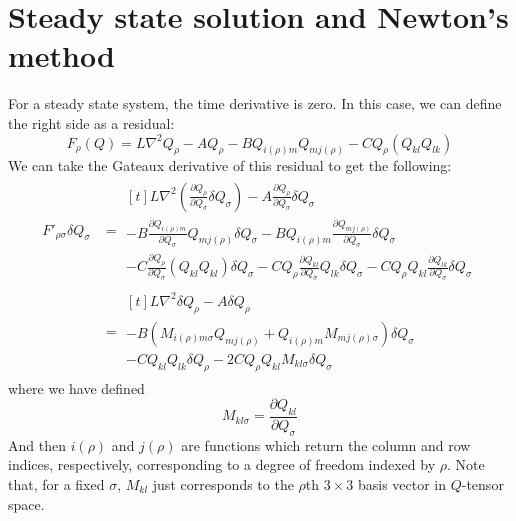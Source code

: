 \documentclass[reqno]{article}
\begin{document}
	\section{Steady state solution and Newton's method}
	For a steady state system, the time derivative is zero.
	In this case, we can define the right side as a residual:
	\begin{equation}
		F_\rho (Q)
		= L \nabla^2 Q_\rho
		- A Q_\rho
		- B Q_{i(\rho) m} Q_{m j(\rho)}
		- C Q_\rho (Q_{kl} Q_{lk})
	\end{equation}
	We can take the Gateaux derivative of this residual to get the following:
	\begin{equation}
	\begin{split}
		F'_{\rho \sigma} \delta Q_\sigma
		&= 
		\begin{multlined}[t]
		L \nabla^2 \left( \frac{\partial Q_\rho}{\partial Q_\sigma} \delta Q_\sigma \right)
		- A \frac{\partial Q_\rho}{\partial Q_\sigma} \delta Q_\sigma \\
		- B \frac{\partial Q_{i (\rho) m}}{\partial Q_\sigma} Q_{m j(\rho)} \delta Q_\sigma
		- B Q_{i(\rho) m} \frac{\partial Q_{m j(\rho)}}{\partial Q_\sigma} \delta Q_\sigma \\
		- C \frac{\partial Q_\rho}{\partial Q_\sigma} (Q_{kl} Q_{kl}) \delta Q_\sigma
		- C Q_\rho \frac{\partial Q_{kl}}{\partial Q_\sigma} Q_{lk} \delta Q_\sigma
		- C Q_\rho Q_{kl} \frac{\partial Q_{lk}}{\partial Q_\sigma} \delta Q_\sigma
		\end{multlined} \\
		&=
		\begin{multlined}[t]
		L \nabla^2 \delta Q_\rho
		- A \delta Q_\rho \\
		- B \left( M_{i(\rho) m \sigma} Q_{m j(\rho)} + Q_{i (\rho) m} M_{m j(\rho) \sigma} \right) \delta Q_\sigma \\
		- C Q_{kl} Q_{lk} \delta Q_\rho
		- 2 C Q_\rho Q_{kl} M_{kl\sigma} \delta Q_\sigma
		\end{multlined}
	\end{split}
	\end{equation}
	where we have defined
	\begin{equation}
		M_{kl\sigma}
		= \frac{\partial Q_{kl}}{\partial Q_\sigma}
	\end{equation}
	And then $i(\rho)$ and $j(\rho)$ are functions which return the column and row indices, respectively, corresponding to a degree of freedom indexed by $\rho$.
	Note that, for a fixed $\sigma$, $M_{kl}$ just corresponds to the $\rho$th $3\times 3$ basis vector in $Q$-tensor space.
\end{document}
